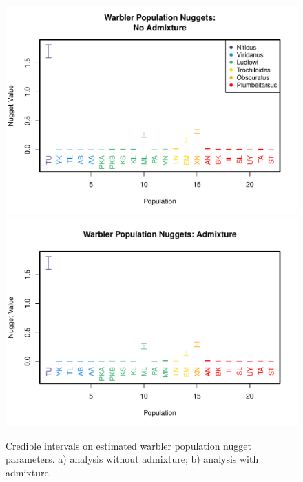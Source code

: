 \documentclass[10pt,letterpaper]{article}
\begin{document}
\begin{figure}
\centering
	\subcaptionbox{\label{warb_pop_noad_nugg}}
		{\includegraphics[height=.45\textheight]{../figs/warblers/warb_pop_NoAd_nugget.pdf}}
	\subcaptionbox{\label{warb_pop_ad_nugg}}
			{\includegraphics[height=.45\textheight]{../figs/warblers/warb_pop_Ad_nugget.pdf}}
	\caption{Credible intervals on estimated warbler population nugget parameters. a) analysis without admixture; b) analysis with admixture.}\label{sfig:warb_pop_nugg}
\end{figure}
\end{document}

